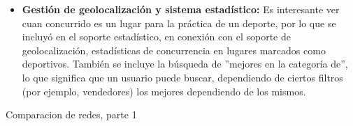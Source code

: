 \begin{itemize}
	\item \textbf{Gestión de geolocalización y sistema estadístico:} Es interesante ver cuan concurrido es un lugar para la práctica de un deporte, por lo que se incluyó en el soporte estadístico, en conexión con el soporte de geolocalización, estadísticas de concurrencia en lugares marcados como deportivos. También se incluye la búsqueda de ''mejores en la categoría de'', lo que significa que un usuario puede buscar, dependiendo de ciertos filtros (por ejemplo, vendedores) los mejores dependiendo de los mismos.

\end{itemize}

\newpage

\begin{landscape}
  
\begin{table}
  \caption{Comparacion de redes, parte 1}
  \label{tab:comparacion_redes_1}

  \begin{center}
  

\end{center}
\end{table}
\end{landscape}
